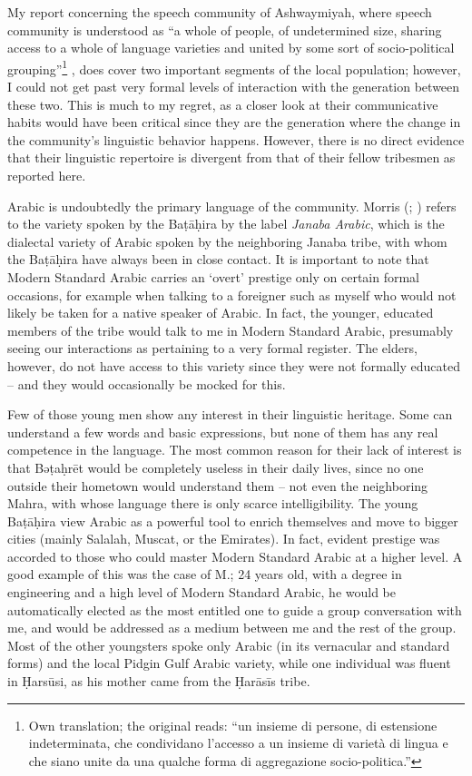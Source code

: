 \documentclass[output=paper]{langscibook}
\begin{document}
My report concerning the speech community of Ashwaymiyah, where speech community is understood as “a whole of people, of undetermined size, sharing access to a whole of language varieties and united by some sort of socio-political grouping”\footnote{Own translation; the original reads: “un insieme di persone, di estensione indeterminata, che condividano l'accesso a un insieme di varietà di lingua e che siano unite da una qualche forma di aggregazione socio-politica.”} \citep[60]{berruto_fondamenti_2002}, does cover two important segments of the local population; however, I could not get past very formal levels of interaction with the generation between these two. This is much to my regret, as a closer look at their communicative habits would have been critical since they are the generation where the change in the community’s linguistic behavior happens. However, there is no direct evidence that their linguistic repertoire is divergent from that of their fellow tribesmen as reported here.

Arabic is undoubtedly the primary language of the community. Morris (\citeyear{morris_preliminary_1983}; \citeyear{morris_thoughts_2017}) refers to the variety spoken by the Baṭāḥira by the label \textit{Janaba Arabic}, which is the dialectal variety of Arabic spoken by the neighboring Janaba tribe, with whom the Baṭāḥira have always been in close contact. It is important to note that Modern Standard Arabic carries an ‘overt' prestige only on certain formal occasions, for example when talking to a foreigner such as myself who would not likely be taken for a native speaker of Arabic. In fact, the younger, educated members of the tribe would talk to me in Modern Standard Arabic, presumably seeing our interactions as pertaining to a very formal register. The elders, however, do not have access to this variety since they were not formally educated – and they would occasionally be mocked for this.

Few of those young men show any interest in their linguistic heritage. Some can understand a few words and basic expressions, but none of them has any real competence in the language. The most common reason for their lack of interest is that Bəṭaḥrēt would be completely useless in their daily lives, since no one outside their hometown would understand them – not even the neighboring Mahra, with whose language there is only scarce intelligibility. The young Baṭāḥira view Arabic as a powerful tool to enrich themselves and move to bigger cities (mainly Salalah, Muscat, or the Emirates). In fact, evident prestige was accorded to those who could master Modern Standard Arabic at a higher level. A good example of this was the case of M.; 24 years old, with a degree in engineering and a high level of Modern Standard Arabic, he would be automatically elected as the most entitled one to guide a group conversation with me, and would be addressed as a medium between me and the rest of the group. Most of the other youngsters spoke only Arabic (in its vernacular and standard forms) and the local Pidgin Gulf Arabic variety, while one individual was fluent in Ḥarsūsi, as his mother came from the Ḥarāsīs tribe. 
\end{document}

